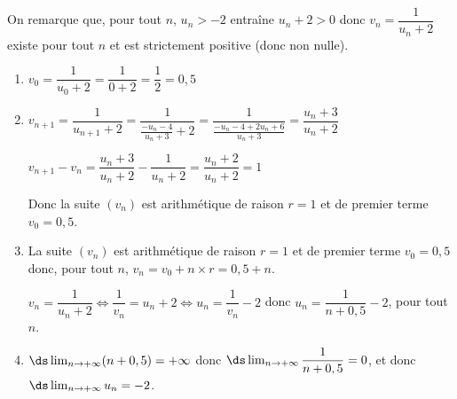 \begin{enumerate}
On remarque que, pour tout $n$, $u_n>-2$ entraîne $u_n+2>0$ donc $v_n = \dfrac{1}{u_n+2}$ existe pour tout $n$ et est strictement positive (donc non nulle).

	\begin{enumerate}
		\item $v_0 = \dfrac{1}{u_0+2} = \dfrac{1}{0+2} = \dfrac{1}{2}=0,5$
		
		\item 
$v_{n+1} = \dfrac{1}{u_{n+1}+2} 
= \dfrac{1}{\frac{-u_n-4}{u_n+3}+2}
= \dfrac{1}{\frac{-u_n-4 +2u_n+6}{u_n+3}}		
= \dfrac{u_n+3}{u_n+2}$

$v_{n+1}-v_n = \dfrac{u_n+3}{u_n+2} - \dfrac{1}{u_n+2}
=\dfrac{u_n+2}{u_n+2}=1$

Donc la suite $(v_n)$ est arithmétique de raison $r=1$ et de premier terme $v_0=0,5$.
			
		\item 
La suite $(v_n)$ est arithmétique de raison $r=1$ et de premier terme $v_0=0,5$ donc, pour tout $n$, $v_n=v_0+n\times r = 0,5 + n$.

$v_n=\dfrac{1}{u_n+2}
\iff
\dfrac{1}{v_n} = u_n+2
\iff
u_n=\dfrac{1}{v_n}-2$ donc $u_n=\dfrac{1}{n+0,5}-2$, pour tout $n$.

		\item 
$\ds\lim_{n\to +\infty} (n+0,5)=+\infty$ donc
$\ds\lim_{n\to +\infty} \dfrac{1}{n+0,5}=0$, et donc
$\ds\lim_{n\to +\infty} u_n=-2$.
	\end{enumerate}
\end{enumerate}

\bigskip
